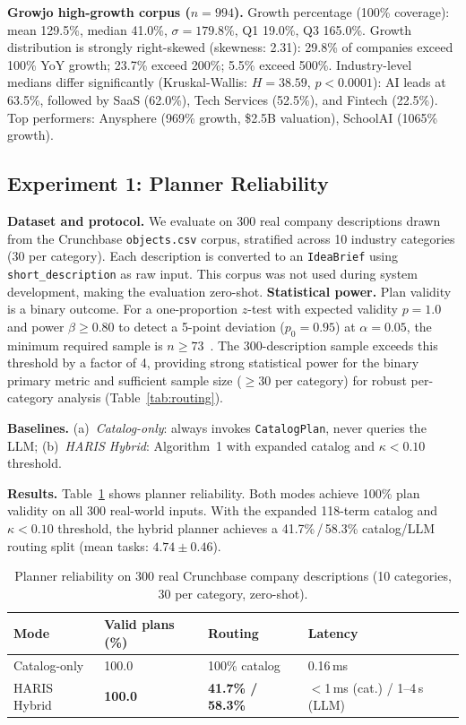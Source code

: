 \documentclass[preprint,12pt]{elsarticle}
\begin{document}
\textbf{Growjo high-growth corpus ($n{=}994$).} Growth percentage (100\%
coverage): mean 129.5\%, median 41.0\%, $\sigma{=}179.8\%$, Q1 19.0\%, Q3
165.0\%. Growth distribution is strongly right-skewed (skewness: 2.31): 29.8\%
of companies exceed 100\% YoY growth; 23.7\% exceed 200\%; 5.5\% exceed 500\%.
Industry-level medians differ significantly (Kruskal-Wallis: $H{=}38.59$,
$p{<}0.0001$): AI leads at 63.5\%, followed by SaaS (62.0\%), Tech Services
(52.5\%), and Fintech (22.5\%). Top performers: Anysphere (969\% growth, \$2.5B
valuation), SchoolAI (1065\% growth).

\subsection{Experiment 1: Planner Reliability}
\label{sec:exp1}

\textbf{Dataset and protocol.} We evaluate on 300 real company descriptions
drawn from the Crunchbase \texttt{objects.csv} corpus, stratified across 10
industry categories (30 per category). Each description is converted to an
\texttt{IdeaBrief} using \texttt{short\_description} as raw input. This corpus
was not used during system development, making the evaluation zero-shot.
\textbf{Statistical power.} Plan validity is a binary outcome. For a
one-proportion $z$-test with expected validity $p{=}1.0$ and power $\beta
\ge 0.80$ to detect a 5-point deviation ($p_0{=}0.95$) at $\alpha{=}0.05$,
the minimum required sample is $n \ge 73$~\citep{cochran1977sampling}.
The 300-description sample exceeds this threshold by a factor of 4, providing
strong statistical power for the binary primary metric and sufficient sample
size ($\ge 30$ per category) for robust per-category analysis
(Table~\ref{tab:routing}).

\textbf{Baselines.} (a)~\emph{Catalog-only}: always invokes
\texttt{CatalogPlan}, never queries the LLM; (b)~\emph{HARIS Hybrid}: Algorithm~1
with expanded catalog and $\kappa < 0.10$ threshold.

\textbf{Results.} Table~\ref{tab:planner} shows planner reliability. Both modes
achieve 100\% plan validity on all 300 real-world inputs. With the expanded
118-term catalog and $\kappa < 0.10$ threshold, the hybrid planner achieves a
41.7\%\,/\,58.3\% catalog/LLM routing split (mean tasks: $4.74 \pm 0.46$).

\begin{table}[t]
\centering
\caption{Planner reliability on 300 real Crunchbase company descriptions
  (10 categories, 30 per category, zero-shot).}
\label{tab:planner}
\begin{tabularx}{\columnwidth}{lXll}
\toprule
\textbf{Mode} & \textbf{Valid plans (\%)} & \textbf{Routing} & \textbf{Latency} \\
\midrule
Catalog-only   & 100.0 & 100\% catalog & 0.16\,ms \\
HARIS Hybrid   & \textbf{100.0} & \textbf{41.7\% / 58.3\%} & ${<}$1\,ms (cat.) / 1--4\,s (LLM) \\
\bottomrule
\end{tabularx}
\end{table}
\end{document}
